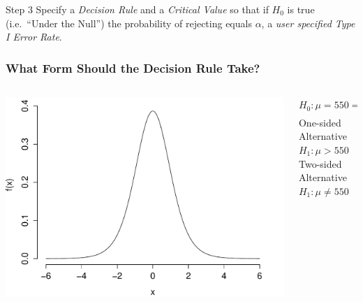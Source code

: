\documentclass[handout]{beamer}
\begin{document}
\begin{frame}
\begin{alertblock}{Step 3}
Specify a \emph{Decision Rule} and a \emph{Critical Value} so that if $H_0$ is true (i.e.\ ``Under the Null'') the probability of rejecting equals $\alpha$, a \emph{user specified Type I Error Rate}.
\end{alertblock}
\end{frame}



\begin{frame}
\frametitle{What Form Should the Decision Rule Take?}
\begin{columns}
\begin{column}[l]{6cm}
\includegraphics[scale = 0.5]{./images/t_pdf}
\end{column}

\begin{column}[r]{6cm}
$H_0\colon \mu=550 \Rightarrow \displaystyle \frac{\bar{X}_n - 550}{S/\sqrt{n}} \sim t(n-1)$\\ \pause
\vspace{1em}
One-sided Alternative $H_1\colon \mu > 550$\\ \pause
\vspace{1em}
Two-sided Alternative $H_1\colon \mu \neq 550$ 
\end{column}

\end{columns}
 
\end{frame}
\end{document}
